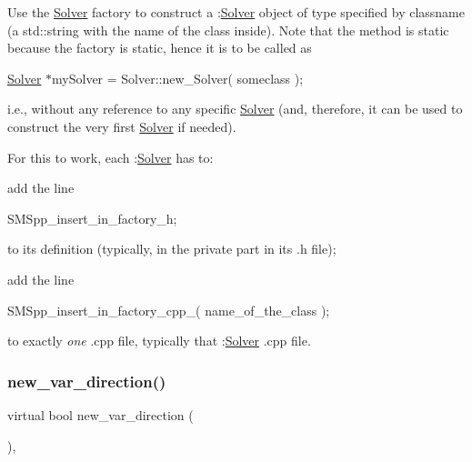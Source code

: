 Use the \mbox{\hyperlink{class_s_m_spp__di__unipi__it_1_1_solver}{Solver}} factory to construct a \+:\mbox{\hyperlink{class_s_m_spp__di__unipi__it_1_1_solver}{Solver}} object of type specified by classname (a std\+::string with the name of the class inside). Note that the method is static because the factory is static, hence it is to be called as

\mbox{\hyperlink{class_s_m_spp__di__unipi__it_1_1_solver}{Solver}} $\ast$my\+Solver = Solver\+::new\+\_\+\+Solver( someclass );

i.\+e., without any reference to any specific \mbox{\hyperlink{class_s_m_spp__di__unipi__it_1_1_solver}{Solver}} (and, therefore, it can be used to construct the very first \mbox{\hyperlink{class_s_m_spp__di__unipi__it_1_1_solver}{Solver}} if needed).

For this to work, each \+:\mbox{\hyperlink{class_s_m_spp__di__unipi__it_1_1_solver}{Solver}} has to\+:


\begin{DoxyItemize}
\item add the line

S\+M\+Spp\+\_\+insert\+\_\+in\+\_\+factory\+\_\+h;

to its definition (typically, in the private part in its .h file);
\item add the line

S\+M\+Spp\+\_\+insert\+\_\+in\+\_\+factory\+\_\+cpp\+\_( name\+\_\+of\+\_\+the\+\_\+class );

to exactly {\itshape one} .cpp file, typically that \+:\mbox{\hyperlink{class_s_m_spp__di__unipi__it_1_1_solver}{Solver}} .cpp file. 
\end{DoxyItemize}\mbox{\label{class_s_m_spp__di__unipi__it_1_1_solver_a673fc1c81a1fc86e55dfab3a37f303bc}} 
\subsubsection{\texorpdfstring{new\+\_\+var\+\_\+direction()}{new\_var\_direction()}}
{\footnotesize\ttfamily virtual bool new\+\_\+var\+\_\+direction (\begin{DoxyParamCaption}\item[{void}]{ }\end{DoxyParamCaption})\hspace{0.3cm}{\ttfamily [inline]}, {\ttfamily [virtual]}}



